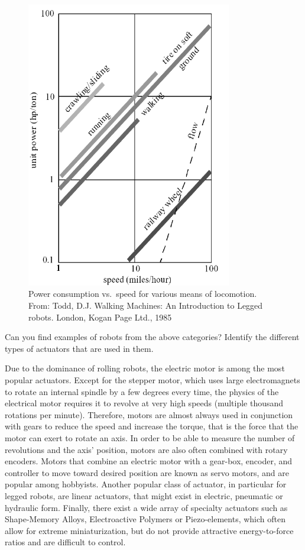 \begin{figure}
	\centering
		\includegraphics[width=0.8\textwidth]{figs/todd85.png}
	\caption{Power consumption vs.\ speed for various means of locomotion. From: Todd, D.J. Walking Machines: An Introduction to Legged robots. London, Kogan Page Ltd., 1985}
	\label{fig:todd}
\end{figure}


\begin{framed}Can you find examples of robots from the above categories? Identify the different types of actuators that are used in them.
\end{framed}

Due to the dominance of rolling robots, the electric motor is among the most popular actuators. Except for the stepper motor, which uses large electromagnets to rotate an internal spindle by a few degrees every time, the physics of the electrical motor requires it to revolve at very high speeds (multiple thousand rotations per minute). Therefore, motors are almost always used in conjunction with gears to reduce the speed and increase the torque, that is the force that the motor can exert to rotate an axis. In order to be able to measure the number of revolutions and the axis' position, motors are also often combined with rotary encoders. Motors that combine an electric motor with a gear-box, encoder, and controller to move toward desired position are known as servo motors, and are popular among hobbyists. Another popular class of actuator, in particular for legged robots, are linear actuators, that might exist in electric, pneumatic or hydraulic form. Finally, there exist a wide array of specialty actuators such as Shape-Memory Alloys, Electroactive Polymers or Piezo-elements, which often allow for extreme miniaturization, but do not provide attractive energy-to-force ratios and are difficult to control.


